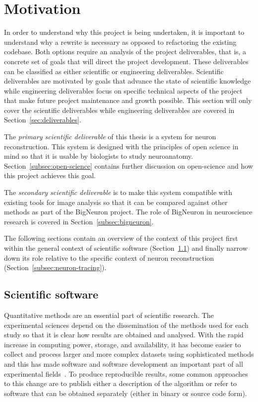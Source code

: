 \section{Motivation}

In order to understand why this project is being undertaken, it is
important to understand why a rewrite is necessary as opposed to refactoring
the existing codebase. Both options require an analysis of the project
deliverables, that is, a concrete set of goals that will direct the project
development. These deliverables can be classified as either scientific or
engineering deliverables. Scientific deliverables are motivated by goals that
advance the state of scientific knowledge while engineering deliverables focus
on specific technical aspects of the project that make future project
maintenance and growth possible. This section will only cover the scientific
deliverables while engineering deliverables are covered in Section~\ref{sec:deliverables}.

The \emph{primary scientific deliverable} of this thesis is a system for
neuron reconstruction. This system is designed with the principles of open
science in mind so that it is usable by biologists to study
neuroanatomy. Section~\ref{subsec:open-science} contains further
discussion on open-science and how this project achieves this
goal.

The \emph{secondary scientific deliverable} is to make this system
compatible with existing tools for image analysis so that it can
be compared against other methods as part of the BigNeuron
project. The role of BigNeuron in neuroscience research is covered
in Section~\ref{subsec:bigneuron}.

The following sections contain an overview of the context of this project
first within the general context of scientific software (Section~\ref{subsec:sci-soft})
and finally narrow down its role relative to the specific context
of neuron reconstruction (Section~\ref{subsec:neuron-tracing}).

\subsection{Scientific software}\label{subsec:sci-soft}
{ %
	Quantitative methods are an essential part of scientific research. The
	experimental sciences depend on the dissemination of the methods used for each
	study so that it is clear how results are obtained and analysed.
	With the rapid increase in computing power, storage, and availability,
	it has become easier to collect and process larger and more complex datasets
	using sophisticated methods and this has made software and
	software development an important part of all experimental
	fields~\autocite{Baxter2006,SSI:hettrick_2014_14809}.
	To produce reproducible results, some common approaches to this change are
	to publish either a description of the algorithm or refer to software
	that can be obtained separately (either in binary or source code form).
}


